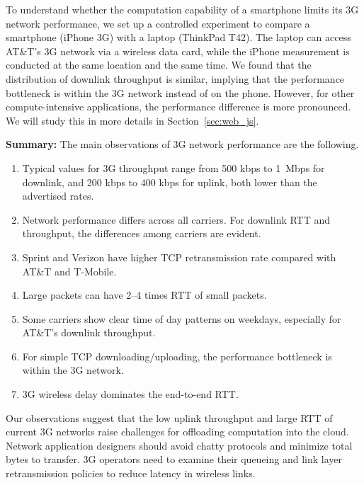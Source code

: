 To understand whether the computation capability of a smartphone
limits its 3G network performance, we set up a controlled experiment to
compare a smartphone (iPhone 3G) with a laptop (ThinkPad T42). The 
laptop can access AT\&T's 3G network via a wireless data card, while 
the iPhone measurement is conducted at the same location and the 
same time. We found that the distribution of downlink throughput is 
similar, implying that the performance bottleneck is within the 
3G network instead of on the phone. However, for other 
compute-intensive applications, the performance difference is
more pronounced. We will study this in more details in Section~\ref{sec:web_js}.

\noindent\textbf{Summary:}  The main observations of 3G network
performance are the following.

\begin{enumerate}
\item Typical values for 3G throughput range from 500 kbps to 1~Mbps
for downlink, and 200 kbps to 400 kbps for uplink, both lower than 
the advertised rates.

\item Network performance differs across all carriers. For downlink 
RTT and throughput, the differences among carriers are evident.

\item Sprint and Verizon have higher TCP retransmission rate 
compared with AT\&T and T-Mobile.

\item Large packets can have 2--4 times RTT of small packets.

\item Some carriers show clear time of day patterns on weekdays, 
especially for AT\&T's downlink throughput.

\item For simple TCP downloading/uploading, the performance 
bottleneck is within the 3G network.

\item 3G wireless delay dominates the end-to-end RTT.
\end{enumerate}

Our observations suggest that the low uplink throughput and large
RTT of current 3G networks raise challenges for offloading computation 
into the cloud. Network application designers should avoid chatty 
protocols and minimize total bytes to transfer. 3G operators need to 
examine their queueing and link layer retransmission policies to 
reduce latency in wireless links. 



